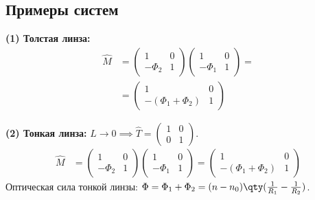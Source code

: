 \subsection{Примеры систем}

\textbf{(1) Толстая линза:}
\begin{align*}
	\hat{M} &= \begin{pmatrix} 1 & 0 \\ -\Phi_2 & 1 \end{pmatrix} \begin{pmatrix} 1 & 0 \\ -\Phi_1 & 1 \end{pmatrix} = \\
	&= \begin{pmatrix} 1 & 0 \\ -(\Phi_1+\Phi_2) & 1 \end{pmatrix}
\end{align*}

\textbf{(2) Тонкая линза:} $L \to 0 \implies \hat{T} = \begin{pmatrix} 1 & 0 \\ 0 & 1 \end{pmatrix}$.
\begin{align*}
	\hat{M} &= \begin{pmatrix} 1 & 0 \\ -\Phi_2 & 1 \end{pmatrix} \begin{pmatrix} 1 & 0 \\ -\Phi_1 & 1 \end{pmatrix} = \begin{pmatrix} 1 & 0 \\ -(\Phi_1+\Phi_2) & 1 \end{pmatrix}
\end{align*}
Оптическая сила тонкой линзы: $\Phi = \Phi_1 + \Phi_2 = (n - n_0)\qty(\frac{1}{R_1} - \frac{1}{R_2})$.

